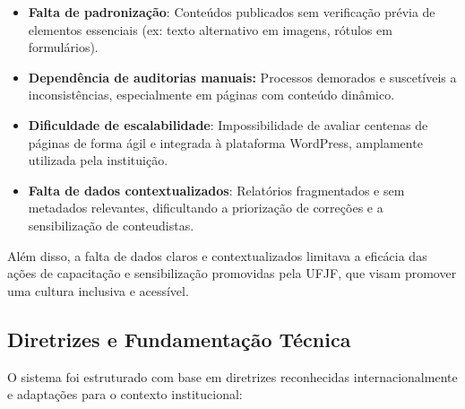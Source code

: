 \documentclass[12pt]{article}
\begin{document}
\begin{itemize}
\item \textbf{Falta de padronização}: Conteúdos publicados sem verificação prévia de
elementos essenciais (ex: texto alternativo em imagens, rótulos em formulários).
\item \textbf{Dependência de auditorias manuais:} Processos demorados e suscetíveis 
a inconsistências, especialmente em páginas com conteúdo 
dinâ\-mico.
\item \textbf{Dificuldade de escalabilidade}: Impossibilidade de avaliar centenas de 
páginas de forma ágil e integrada à plataforma WordPress, amplamente utilizada pela
instituição.
\item \textbf{Falta de dados contextualizados}: Relatórios fragmentados e sem
metadados relevantes, dificultando a priorização de correções e a sensibilização de
conteudistas.
\end{itemize}

Além disso, a falta de dados claros e contextualizados limitava a eficácia das
ações de capacitação e sensibilização promovidas pela UFJF, que visam promover uma
cultura inclusiva e acessível.

\subsection{Diretrizes e Fundamentação Técnica}\label{subsec:diretrizes}
O sistema foi estruturado com base em diretrizes reconhecidas internacionalmente e
adaptações para o contexto institucional:
\end{document}
